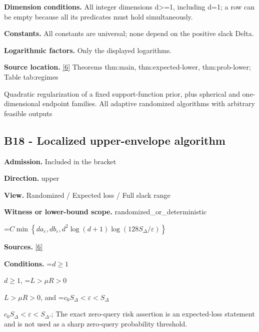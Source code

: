 \documentclass[10pt,a4paper]{article}
\newcommand{\AtlasMath}[1]{\par\begingroup\centering\setbox0=\hbox{$\displaystyle #1$}\ifdim\wd0>1.4\linewidth\typeout{ATLAS WIDE FORMULA: \the\wd0}\fi\ifdim\wd0>\linewidth\resizebox{\linewidth}{!}{\box0}\else\box0\fi\par\endgroup}
\newcommand{\AtlasInlineMath}[1]{\begingroup\setbox0=\hbox{$#1$}\ifdim\wd0>.4\linewidth\endgroup\AtlasMath{#1}\else\endgroup$#1$\fi}
\begin{document}
\textbf{Dimension conditions.} All integer dimensions d>=1, including d=1; a row can be empty because all its predicates must hold simultaneously.



\textbf{Constants.} All constants are universal; none depend on the positive slack Delta.



\textbf{Logarithmic factors.} Only the displayed logarithms.



\textbf{Source location.} \href{https://github.com/WU-Wendao/Colombo/blob/main/colombo_sensorium/Complexity_altas/data/sources/colombo/U10/manuscript.pdf}{[6]} Theorems thm:main, thm:expected-lower, thm:prob-lower; Table tab:regimes



Quadratic regularization of a fixed support-function prior, plus spherical and one-dimensional endpoint families. All adaptive randomized algorithms with arbitrary feasible outputs



\subsection{B18 - Localized upper-envelope algorithm}


\textbf{Admission.} Included in the bracket



\textbf{Direction.} upper



\textbf{View.} Randomized / Expected loss / Full slack range



\textbf{Witness or lower-bound scope.} randomized\_or\_deterministic



\AtlasMath{C\min\left\{da_\varepsilon,db_\varepsilon,d^2\log(d+1)\log(128S_\Delta/\varepsilon)\right\}}


\textbf{Sources.} \href{https://github.com/WU-Wendao/Colombo/blob/main/colombo_sensorium/Complexity_altas/data/sources/colombo/U10/manuscript.pdf}{[6]}



\textbf{Conditions.} \AtlasInlineMath{d\ge1}, \AtlasInlineMath{L>\mu R>0}, and \AtlasInlineMath{c_0S_\Delta<\varepsilon<S_\Delta}.; The exact zero-query risk assertion is an expected-loss statement and is not used as a sharp zero-query probability threshold.
\end{document}
